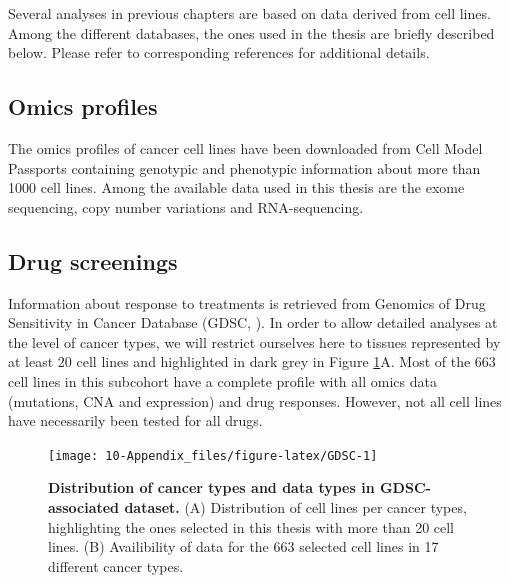 \documentclass[a4paper,12pt,twoside,onecolumn,openright,final,oldfontcommands]{memoir}
\begin{document}
Several analyses in previous chapters are based on data derived from
cell lines. Among the different databases, the ones used in the thesis
are briefly described below. Please refer to corresponding references
for additional details.

\subsection{Omics profiles}\label{omics-profiles}

The omics profiles of cancer cell lines have been downloaded from Cell
Model Passports \citep{van2019cell} containing genotypic and phenotypic
information about more than 1000 cell lines. Among the available data
used in this thesis are the exome sequencing, copy number variations and
RNA-sequencing.

\subsection{Drug screenings}\label{appendix-GDSC}

Information about response to treatments is retrieved from Genomics of
Drug Sensitivity in Cancer Database (GDSC, \citet{yang2012genomics}). In
order to allow detailed analyses at the level of cancer types, we will
restrict ourselves here to tissues represented by at least 20 cell lines
and highlighted in dark grey in Figure \ref{fig:GDSC}A. Most of the 663
cell lines in this subcohort have a complete profile with all omics data
(mutations, CNA and expression) and drug responses. However, not all
cell lines have necessarily been tested for all drugs.

\begin{figure}

{\centering \texttt{[image: 10-Appendix\_files/figure-latex/GDSC-1]} 

}

\caption[Distribution of cancer types and data types in GDSC-associated dataset]{\textbf{Distribution of cancer types and data types
in GDSC-associated dataset.} (A) Distribution of cell lines per cancer
types, highlighting the ones selected in this thesis with more than 20
cell lines. (B) Availibility of data for the 663 selected cell lines in
17 different cancer types.}\label{fig:GDSC}
\end{figure}
\end{document}
